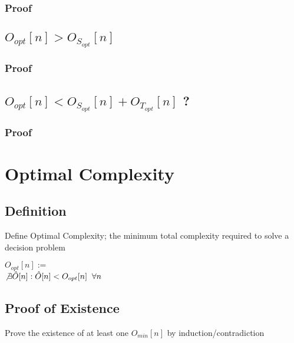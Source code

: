 \documentclass[11pt]{article}
\begin{document}
\subsubsection{Proof}

\subsection{$O_{opt}[n] > O_{S_{opt}}[n]$}
\subsubsection{Proof}

\subsection{$O_{opt}[n] < O_{S_{opt}}[n] +  O_{T_{opt}}[n]$ ?}
\subsubsection{Proof}







\newpage
\section{Optimal Complexity}

\subsection{Definition}
Define Optimal Complexity; the minimum total complexity required to solve a decision problem
\begin{center}
$O_{opt}[n] :=$
\\ \vspace{2mm}
$\not \exists \hat{O} \lbrack n \rbrack : \hat{O} \lbrack n \rbrack < O_{opt}[n] \hspace{2mm} \forall n$
\end{center}

\subsection{Proof of Existence}
Prove the existence of at least one $O_{min}[n]$ by induction/contradiction
\end{document}
